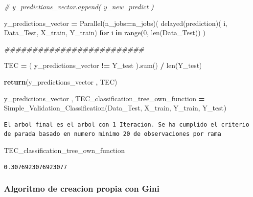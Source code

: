\documentclass[
  11pt,
  a4paper,
]{article}
\newenvironment{Shaded}{\begin{snugshade}}{\end{snugshade}}
\newcommand{\BuiltInTok}[1]{#1}
\newcommand{\CommentTok}[1]{\textcolor[rgb]{0.56,0.35,0.01}{\textit{#1}}}
\newcommand{\ControlFlowTok}[1]{\textcolor[rgb]{0.13,0.29,0.53}{\textbf{#1}}}
\newcommand{\DecValTok}[1]{\textcolor[rgb]{0.00,0.00,0.81}{#1}}
\newcommand{\KeywordTok}[1]{\textcolor[rgb]{0.13,0.29,0.53}{\textbf{#1}}}
\newcommand{\NormalTok}[1]{#1}
\newcommand{\OperatorTok}[1]{\textcolor[rgb]{0.81,0.36,0.00}{\textbf{#1}}}
\begin{document}
\begin{Shaded}
\begin{Highlighting}[]
        \CommentTok{\# y\_predictions\_vector.append( y\_new\_predict )}

    
\NormalTok{    y\_predictions\_vector }\OperatorTok{=}\NormalTok{ Parallel(n\_jobs}\OperatorTok{=}\NormalTok{n\_jobs)( delayed(prediction)( i, Data\_Test, X\_train, Y\_train) }\ControlFlowTok{for}\NormalTok{ i }\KeywordTok{in} \BuiltInTok{range}\NormalTok{(}\DecValTok{0}\NormalTok{, }\BuiltInTok{len}\NormalTok{(Data\_Test)) )}

    \CommentTok{\#\#\#\#\#\#\#\#\#\#\#\#\#\#\#\#\#\#\#\#\#\#\#\#\#}

 
\NormalTok{    TEC }\OperatorTok{=}\NormalTok{ ( y\_predictions\_vector }\OperatorTok{!=}\NormalTok{ Y\_test ).}\BuiltInTok{sum}\NormalTok{()  }\OperatorTok{/} \BuiltInTok{len}\NormalTok{(Y\_test)     }

 
    \ControlFlowTok{return}\NormalTok{(y\_predictions\_vector , TEC)}
\end{Highlighting}
\end{Shaded}

\begin{Shaded}
\begin{Highlighting}[]
\NormalTok{y\_predictions\_vector , TEC\_classification\_tree\_own\_function }\OperatorTok{=}\NormalTok{ Simple\_Validation\_Classification(Data\_Test, X\_train, Y\_train, Y\_test)}
\end{Highlighting}
\end{Shaded}

\begin{verbatim}
El arbol final es el arbol con 1 Iteracion. Se ha cumplido el criterio de parada basado en numero minimo 20 de observaciones por rama
\end{verbatim}

\begin{Shaded}
\begin{Highlighting}[]
\NormalTok{TEC\_classification\_tree\_own\_function}
\end{Highlighting}
\end{Shaded}

\begin{verbatim}
0.3076923076923077
\end{verbatim}

\newpage

\hypertarget{algoritmo-de-creacion-propia-con-gini}{%
\subsubsection{Algoritmo de creacion propia con
Gini}\label{algoritmo-de-creacion-propia-con-gini}}
\end{document}
